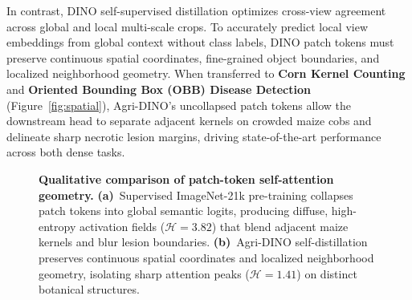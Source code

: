 \documentclass[10pt,twocolumn,letterpaper]{article}
\begin{document}
In contrast, DINO self-supervised distillation optimizes cross-view agreement across global and local multi-scale crops. To accurately predict local view embeddings from global context without class labels, DINO patch tokens must preserve continuous spatial coordinates, fine-grained object boundaries, and localized neighborhood geometry. When transferred to \textbf{Corn Kernel Counting} and \textbf{Oriented Bounding Box (OBB) Disease Detection} (Figure~\ref{fig:spatial}), Agri-DINO's uncollapsed patch tokens allow the downstream head to separate adjacent kernels on crowded maize cobs and delineate sharp necrotic lesion margins, driving state-of-the-art performance across both dense tasks.

\begin{figure}[t]
\centering
{}%
\caption{
  \textbf{Qualitative comparison of patch-token self-attention geometry.}
  \textbf{(a)}~Supervised ImageNet-21k pre-training collapses patch tokens into global semantic logits, producing diffuse, high-entropy activation fields ($\mathcal{H}=3.82$) that blend adjacent maize kernels and blur lesion boundaries.
  \textbf{(b)}~Agri-DINO self-distillation preserves continuous spatial coordinates and localized neighborhood geometry, isolating sharp attention peaks ($\mathcal{H}=1.41$) on distinct botanical structures.
}
\label{fig:attention}
\vspace{-6pt}
\end{figure}
\end{document}
